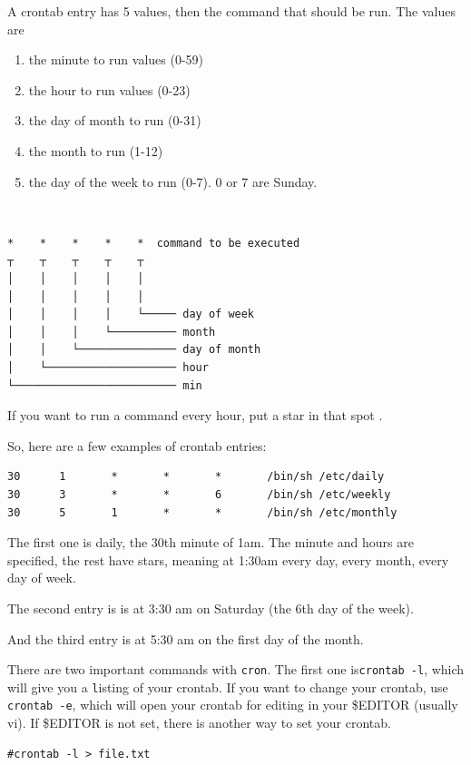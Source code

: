 A crontab entry has 5 values, then the command that should be run. 
The  values are 
\begin{enumerate}
    \item the minute to run values (0-59)
    \item the hour to run values (0-23)
    \item the day of month to run (0-31)
    \item the month to run (1-12)
    \item the day of the week to run (0-7). 0 or 7 are Sunday.
\end{enumerate}

{\tt
\begin{lstlisting}[style=ascii-tree]
*    *    *    *    *  command to be executed
┬    ┬    ┬    ┬    ┬
│    │    │    │    │
│    │    │    │    │
│    │    │    │    └───── day of week
│    │    │    └────────── month
│    │    └─────────────── day of month
│    └──────────────────── hour
└───────────────────────── min
\end{lstlisting}
}

If you want to run a command every hour, put a star in that spot {\tt *}.

So, here are a few examples of crontab entries:

\begin{verbatim}
30      1       *       *       *       /bin/sh /etc/daily
30      3       *       *       6       /bin/sh /etc/weekly
30      5       1       *       *       /bin/sh /etc/monthly
\end{verbatim}

The first one is daily, the 30th minute of 1am. The
minute and hours are specified, the rest have stars, meaning at 1:30am 
every day, every month, every day of week.

The second entry is is at 3:30 am on Saturday (the 6th day of the week).

And the third entry is at 5:30 am on the first day of the month. 

There are two important commands with {\tt cron}. The first one is{\tt crontab -l},
which will give you a {\tt l}isting of your crontab.  If you want to change your 
crontab, use {\tt crontab -e}, which will open your crontab for editing in your 
\$EDITOR (usually vi). If \$EDITOR is not set, there is another way to set your crontab.

\begin{verbatim}
#crontab -l > file.txt
\end{verbatim}


